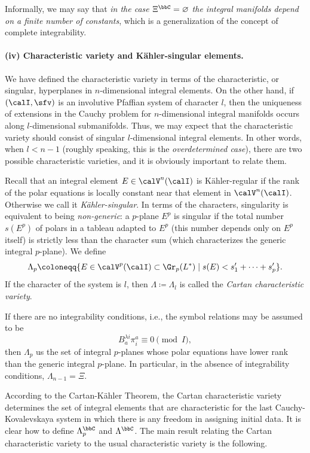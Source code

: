 Informally, we may say that \emph{in the case $\Xi^\bbC=\varnothing$ the integral manifolds depend on a finite number of constants}, which is a generalization of the concept of complete integrability.

\paragraph{(iv) Characteristic variety and K\"ahler-singular elements.} We have defined the characteristic variety in terms of the characteristic, or singular, hyperplanes in $n$-dimensional integral elements. On the other hand, if $(\calI,\sfv)$ is an involutive Pfaffian system of character $l$, then the uniqueness of extensions in the Cauchy problem for $n$-dimensional integral manifolds occurs along $l$-dimensional submanifolds. Thus, we may expect that the characteristic variety should consist of singular $l$-dimensional integral elements. In other words, when $l<n-1$ (roughly speaking, this is the \emph{overdetermined case}), there are two possible characteristic varieties, and it is obviously important to relate them.

Recall that an integral element $E\in\calV^n(\calI)$ is K\"ahler-regular if the rank of the polar equations is locally constant near that element in $\calV^n(\calI)$. Otherwise we call it \emph{K\"ahler-singular}. In terms of the characters, singularity is equivalent to being \emph{non-generic}: a $p$-plane $E^p$ is singular if the total number $s(E^p)$ of polars in a tableau adapted to $E^p$ (this number depends only on $E^p$ itself) is strictly less than the character sum (which characterizes the generic integral $p$-plane). We define 
\[\Lambda_p\coloneqq \{E\in \calV^p(\calI)\subset \Gr_p(L^\ast)\mid s(E)<s'_1+\cdots+s'_p\}.\]
If the character of the system is $l$, then $\Lambda\coloneqq \Lambda_l$ is called the \emph{Cartan characteristic variety}. 

If there are no integrability conditions, i.e., the symbol relations may be assumed to be 
\[B^{\lambda i}_a \pi^a_i\equiv 0\pmod{I},\]
then $\Lambda_p$ us the set of integral $p$-planes whose polar equations have lower rank than the generic integral $p$-plane. In particular, in the absence of integrability conditions, $\Lambda_{n-1}=\Xi$.

According to the Cartan-K\"ahler Theorem, the Cartan characteristic variety determines the set of integral elements that are characteristic for the last Cauchy-Kovalevskaya system in which there is any freedom in assigning initial data. It is clear how to define $\Lambda_p^\bbC$ and $\Lambda^\bbC$. The main result relating the Cartan characteristic variety to the usual characteristic variety is the following.

